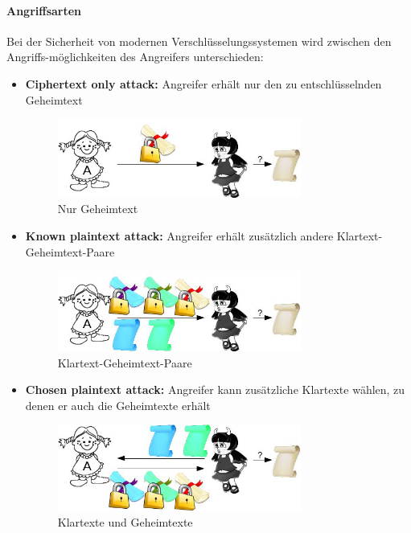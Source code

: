 \documentclass[10pt,a4paper]{article}
\begin{document}
\paragraph*{Angriffsarten}Bei der Sicherheit von modernen Verschlüsselungssystemen wird zwischen den Angriffs-möglichkeiten des Angreifers unterschieden:
\begin{itemize}[noitemsep,topsep=0pt,leftmargin=*]
    \item \textbf{Ciphertext only attack:} Angreifer erhält nur den zu entschlüsselnden Geheimtext
    \begin{figure}[ht]
        \begin{center}
        \includegraphics[width=8cm]{images/coa.png}
        \caption{Nur Geheimtext}
        \label{coa}
        \end{center}
    \end{figure}
    \item \textbf{Known plaintext attack:} Angreifer erhält zusätzlich andere Klartext-Geheimtext-Paare
    \begin{figure}[ht]
        \begin{center}
        \includegraphics[width=8cm]{images/kpa.png}
        \caption{Klartext-Geheimtext-Paare}
        \label{kpa}
        \end{center}
    \end{figure}
    \item \textbf{Chosen plaintext attack:} Angreifer kann zusätzliche Klartexte wählen, zu denen er auch die Geheimtexte erhält
    \begin{figure}[ht]
        \begin{center}
        \includegraphics[width=8cm]{images/cpa.png}
        \caption{Klartexte und Geheimtexte}
        \label{cpa}
        \end{center}
    \end{figure}
\end{itemize}
\end{document}

